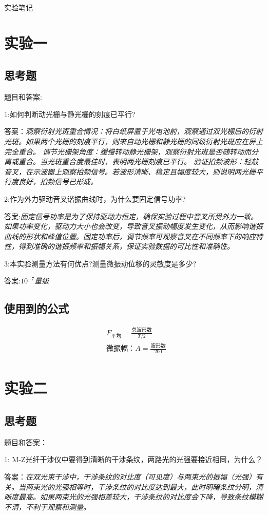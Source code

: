 \documentclass[10pt,journal,compsoc]{IEEEtran}
\begin{document}
实验笔记
\section{实验一}
\subsection{思考题}
题目和答案:

1:如何判断动光栅与静光栅的刻痕已平行?

答案：\textit{观察衍射光斑重合情况：将白纸屏置于光电池前，观察通过双光栅后的衍射光斑。如果两个光栅的刻痕平行，则来自动光栅和静光栅的同级衍射光斑应在屏上完全重合。
调节光栅架角度：缓慢转动静光栅架，观察衍射光斑是否随转动而分离或重合。当光斑重合度最佳时，表明两光栅刻痕已平行。
验证拍频波形：轻敲音叉，在示波器上观察拍频信号。若波形清晰、稳定且幅度较大，则说明两光栅平行度良好，拍频信号已形成。}



2:作为外力驱动音叉谐振曲线时，为什么要固定信号功率?

答案:\textit{固定信号功率是为了保持驱动力恒定，确保实验过程中音叉所受外力一致。如果功率变化，驱动力大小也会改变，导致音叉振动幅度发生变化，从而影响谐振曲线的形状和峰值位置。固定功率后，调节频率可观察音叉在不同频率下的响应特性，得到准确的谐振频率和振幅关系，保证实验数据的可比性和准确性。
}

3:本实验测量方法有何优点?测量微振动位移的灵敏度是多少?

答案:\textit{$10^{-7}$量级}

\subsection{使用到的公式}
\begin{align*}
&F_{平均}=\frac{\text{总波形数}}{T/2}\\
&\text{微振幅：}A=\frac{\text{波形数}}{200}\\
\end{align*}


\section{实验二}
\subsection{思考题}
题目和答案：

1: M-Z光纤干涉仪中要得到清晰的干涉条纹，两路光的光强要接近相同，为什么？

答案：\textit{在双光束干涉中，干涉条纹的对比度（可见度）与两束光的振幅（光强）有关。当两束光的光强相等时，干涉条纹的对比度达到最大，此时明暗条纹分明，清晰度最高。如果两束光的光强相差较大，干涉条纹的对比度会下降，导致条纹模糊不清，不利于观察和测量。}
\end{document}
